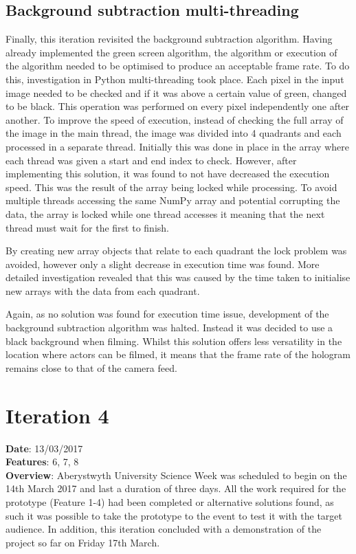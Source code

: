 \subsection{Background subtraction multi-threading}
Finally, this iteration revisited the background subtraction algorithm. Having already implemented the green screen algorithm, the algorithm or execution of the algorithm needed to be optimised to produce an acceptable frame rate. To do this, investigation in Python multi-threading took place. Each pixel in the input image needed to be checked and if it was above a certain value of green, changed to be black. This operation was performed on every pixel independently one after another. To improve the speed of execution, instead of checking the full array of the image in the main thread, the image was divided into 4 quadrants and each processed in a separate thread. Initially this was done in place in the array where each thread was given a start and end index to check. However, after implementing this solution, it was found to not have decreased the execution speed. This was the result of the array being locked while processing. To avoid multiple threads accessing the same NumPy array and potential corrupting the data, the array is locked while one thread accesses it meaning that the next thread must wait for the first to finish. 

By creating new array objects that relate to each quadrant the lock problem was avoided, however only a slight decrease in execution time was found. More detailed investigation revealed that this was caused by the time taken to initialise new arrays with the data from each quadrant.

Again, as no solution was found for execution time issue, development of the background subtraction algorithm was halted. Instead it was decided to use a black background when filming. Whilst this solution offers less versatility in the location where actors can be filmed, it means that the frame rate of the hologram remains close to that of the camera feed. 

  
\newpage

\section{Iteration 4}
\textbf{Date}: 13/03/2017 \\
\textbf{Features}: 6, 7, 8 \\
\textbf{Overview}: Aberystwyth University Science Week was scheduled to begin on the 14th March 2017 and last a duration of three days. All the work required for the prototype (Feature 1-4) had been completed or alternative solutions found, as such it was possible to take the prototype to the event to test it with the target audience. In addition, this iteration concluded with a demonstration of the project so far on Friday 17th March. 

